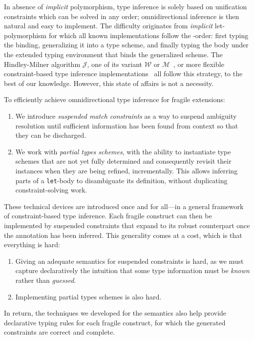 \documentclass[acmsmall,screen,nonacm,review]{acmart}
\begin{document}
In absence of \emph{implicit} polymorphism, type inference is solely based
on unification constraints which can be solved in any order;
omnidirectional inference is then natural and easy to implement.  The
difficulty originates from \ML \emph{implicit} let-polymorphism for which all known
implementations follow the \geninst-order: first typing the binding,
generalizing it into a type scheme, and finally typing the body under the extended
typing environment that binds the generalized scheme.
The Hindley-Milner algorithm $\mathcal{J}$, one of
its variant $\mathcal{W}$ or $\mathcal{M}$~\citep*
{Lee_Yi/algoM@toplas1998}, or more flexible constraint-based type
inference implementations~\citep* {Remy/mleth,Remy/thesis,
Odersky-Sulzmann-Wehr@tpos, Pottier-Remy/emlti} all follow this strategy, to
the best of our knowledge. However, this state of affairs is not a
necessity.

To efficiently achieve omnidirectional type inference for fragile \ML
extensions:
\begin{enumerate}

\item
  We introduce \emph{suspended match constraints} as a way to suspend
  ambiguity resolution until sufficient information has been found from
  context so that they can be discharged.

\item
  We work with \emph{partial types schemes}, \ie with the ability to
  instantiate type
  schemes that are not yet fully determined and consequently revisit their
  instances when they are being refined, incrementally. This allows
  inferring parts of a \texttt{let}-body to disambiguate its definition,
  without duplicating constraint-solving work.

\end{enumerate}

These technical devices are introduced once and for all---in a general
framework of constraint-based type inference. Each fragile \ML construct can
then be implemented by suspended constraints that expand to its robust
counterpart once the annotation has been inferred. This generality comes at
a cost, which is that everything is hard:
\begin{enumerate}

\item
  Giving an adequate semantics for suspended constraints is hard, as we
  must capture declaratively the intuition that some type information must be
  \emph{known} rather than \emph{guessed}.

\item
  Implementing partial types schemes is also hard.

\end{enumerate}
In return, the techniques we developed for the semantics
also help provide declarative typing rules for each fragile
construct, for which the generated constraints are correct and
complete.
\end{document}
